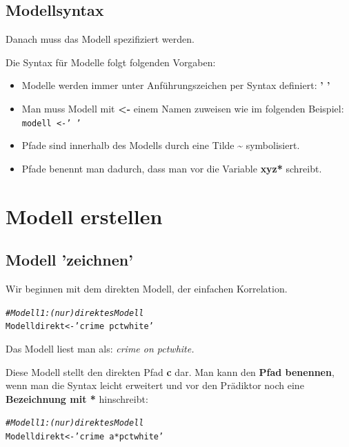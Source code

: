 \documentclass[a4paper]{article}\usepackage[]{graphicx}\usepackage[]{color}
\makeatletter
\newcommand{\hlstr}[1]{\textcolor[rgb]{0.192,0.494,0.8}{#1}}%
\newcommand{\hlcom}[1]{\textcolor[rgb]{0.678,0.584,0.686}{\textit{#1}}}%
\newcommand{\hlstd}[1]{\textcolor[rgb]{0.345,0.345,0.345}{#1}}%
\newcommand{\hlkwb}[1]{\textcolor[rgb]{0.69,0.353,0.396}{#1}}%
\newenvironment{kframe}{%
 \def\at@end@of@kframe{}%
 \ifinner\ifhmode%
  \def\at@end@of@kframe{\end{minipage}}%
  \begin{minipage}{\columnwidth}%
 \fi\fi%
 \def\FrameCommand##1{\hskip\@totalleftmargin \hskip-\fboxsep
 \colorbox{shadecolor}{##1}\hskip-\fboxsep
     \hskip-\linewidth \hskip-\@totalleftmargin \hskip\columnwidth}%
 \MakeFramed {\advance\hsize-\width
   \@totalleftmargin\z@ \linewidth\hsize
   \@setminipage}}%
 {\par\unskip\endMakeFramed%
 \at@end@of@kframe}
\newenvironment{knitrout}{}{} %
\makeatother
\begin{document}
\subsection{Modellsyntax}
Danach muss das Modell spezifiziert werden. 

Die Syntax f\"ur Modelle folgt folgenden Vorgaben:

\begin{itemize}
  \item Modelle werden immer unter Anf\"uhrungszeichen per Syntax definiert: \textbf{' '}
  \item Man muss Modell mit \textbf{\textless-} einem Namen zuweisen wie im folgenden Beispiel: \texttt{modell \textless-'  '}
  \item Pfade sind innerhalb des Modells durch eine Tilde \textbf{\~ } symbolisiert. 
  \item Pfade benennt man dadurch, dass man vor die Variable \textbf{xyz*} schreibt.
\end{itemize}


\section{Modell erstellen}
\subsection{Modell 'zeichnen'}
Wir beginnen mit dem direkten Modell, der einfachen Korrelation.
\begin{knitrout}
\color{fgcolor}\begin{kframe}
\begin{alltt}
\hlcom{# Modell 1: (nur) direktes Modell}
\hlstd{Modelldirekt} \hlkwb{<-} \hlstr{'crime ~ pctwhite'}
\end{alltt}
\end{kframe}
\end{knitrout}

Das Modell liest man als: \textit{crime on pctwhite.}

Diese Modell stellt den direkten Pfad \textbf{c} dar. Man kann den \textbf{Pfad benennen}, wenn man die Syntax leicht erweitert und vor den Pr\"adiktor noch eine \textbf{Bezeichnung mit *} hinschreibt:
\begin{knitrout}
\color{fgcolor}\begin{kframe}
\begin{alltt}
\hlcom{# Modell 1: (nur) direktes Modell}
\hlstd{Modelldirekt} \hlkwb{<-} \hlstr{'crime ~ a * pctwhite'}
\end{alltt}
\end{kframe}
\end{knitrout}
\end{document}
